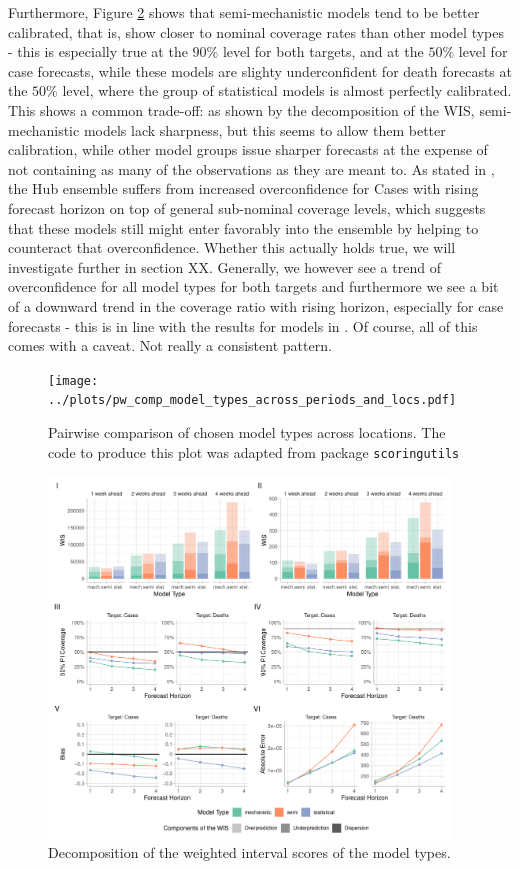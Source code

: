 Furthermore, Figure \ref{fig:decomp_model_types} shows that semi-mechanistic models tend to be better calibrated, that is, show closer to nominal coverage rates than other model types - this is especially true at the $90\%$ level for both targets, and at the $50\%$ level for case forecasts, while these models are slighty underconfident for death forecasts at the $50\%$ level, where the group of statistical models is almost perfectly calibrated. This shows a common trade-off: as shown by the decomposition of the WIS, semi-mechanistic models lack sharpness, but this seems to allow them better calibration, while other model groups issue sharper forecasts at the expense of not containing as many of the observations as they are meant to. As stated in \cite{sherratt_european_2022}, the Hub ensemble suffers from increased overconfidence for Cases with rising forecast horizon on top of general sub-nominal coverage levels, which suggests that these models still might enter favorably into the ensemble by helping to counteract that overconfidence. Whether this actually holds true, we will investigate further in section XX. Generally, we however see a trend of overconfidence for all model types for both targets and furthermore we see a bit of a downward trend in the coverage ratio with rising horizon, especially for case forecasts - this is in line with the results for models in \cite{sherratt_european_2022}.
Of course, all of this comes with a caveat. Not really a consistent pattern.
\begin{figure}
\centering
\texttt{[image: ../plots/pw\_comp\_model\_types\_across\_periods\_and\_locs.pdf]}
\caption{Pairwise comparison of chosen model types across locations. The code to produce this plot was adapted from package \texttt{scoringutils}}
\label{fig:pw_comp_modeltypes_byloc}
\end{figure}
\begin{figure}
\centering
\includegraphics[width = 0.95\textwidth]{../plots/overall_assessment_model_types.pdf}
\caption{Decomposition of the weighted interval scores of the model types. }
\label{fig:decomp_model_types}
\end{figure}
